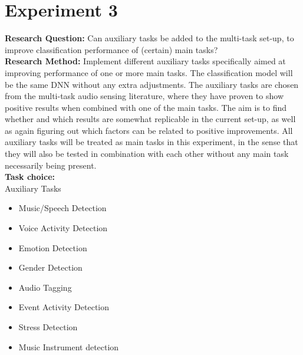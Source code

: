 \section{Experiment 3}
	
	\textbf{Research Question:} 
	Can auxiliary tasks be added to the multi-task set-up, to improve classification performance of (certain) main tasks? \\
	
	\textbf{Research Method:} Implement different auxiliary tasks specifically aimed at improving performance of one or more main tasks. The classification model will be the same DNN without any extra adjustments. The auxiliary tasks are chosen from the multi-task audio sensing literature, where they have proven to show positive results when combined with one of the main tasks. The aim is to find whether and which results are somewhat replicable in the current set-up, as well as again figuring out which factors can be related to positive improvements. All auxiliary tasks will be treated as main tasks in this experiment, in the sense that they will also be tested in combination with each other without any main task necessarily being present.\\
	
	\textbf{Task choice:}\\
	
	Auxiliary Tasks\\
	
	\begin{itemize}
		\item Music/Speech Detection
		\item Voice Activity Detection
		\item Emotion Detection
		\item Gender Detection
		\item Audio Tagging
		\item Event Activity Detection
		\item Stress Detection
		\item Music Instrument detection
	\end{itemize}
	
	
	
